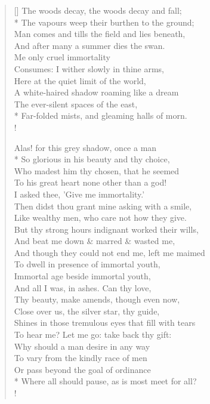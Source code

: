 \documentclass[MAIN]{subfiles}
\begin{document}
\settowidth{\versewidth}{The woods decay, the woods decay and fall;}
\begin{verse}[\versewidth]
The woods decay, the woods decay and fall;\\*
The vapours weep their burthen to the ground;\\
Man comes and tills the field and lies beneath,\\
And after many a summer dies the swan.\\
Me only cruel immortality\\
Consumes: I wither slowly in thine arms,\\
Here at the quiet limit of the world,\\
A white-haired shadow roaming like a dream\\ 
The ever-silent spaces of the east,\\*
Far-folded mists, and gleaming halls of morn.\\!

Alas! for this grey shadow, once a man\\*
So glorious in his beauty and thy choice,\\
Who madest him thy chosen, that he seemed\\
To his great heart none other than a god!\\
I asked thee, 'Give me immortality.'\\
Then didst thou grant mine asking with a smile,\\
Like wealthy men, who care not how they give.\\
But thy strong hours indignant worked their wills,\\
And beat me down \& marred \& wasted me,\\ 
And though they could not end me, left me maimed\\
To dwell in presence of immortal youth,\\
Immortal age beside immortal youth,\\
And all I was, in ashes. Can thy love,\\
Thy beauty, make amends, though even now,\\
Close over us, the silver star, thy guide,\\
Shines in those tremulous eyes that fill with tears\\
To hear me? Let me go: take back thy gift:\\
Why should a man desire in any way\\
To vary from the kindly race of men\\
Or pass beyond the goal of ordinance\\*
Where all should pause, as is most meet for all?\\!


\end{verse}
\end{document}
